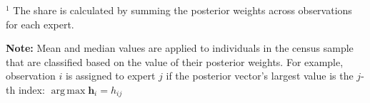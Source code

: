 \documentclass[12pt]{article}
\DeclareMathOperator*{\argmax}{arg\,max}
\begin{document}
\begin{table}
\begin{threeparttable}
\begin{tablenotes}
        \item{\footnotesize $^{1}$ The share is calculated by summing the 
        posterior weights across observations for each expert.}
        \item{\footnotesize \textbf{Note:} Mean and median values are applied to individuals
        in the census sample that are classified based on the value of their posterior weights.
        For example, observation $i$ is assigned to expert $j$ if the posterior vector's
        largest value is the $j$-th index: $\argmax \boldsymbol{h}_{i} = h_{ij}$}
      \end{tablenotes} \label{tbl:HME3_sample_comparison}
    \end{threeparttable}
  \end{table}


\clearpage

\printbibliography
\end{document}
